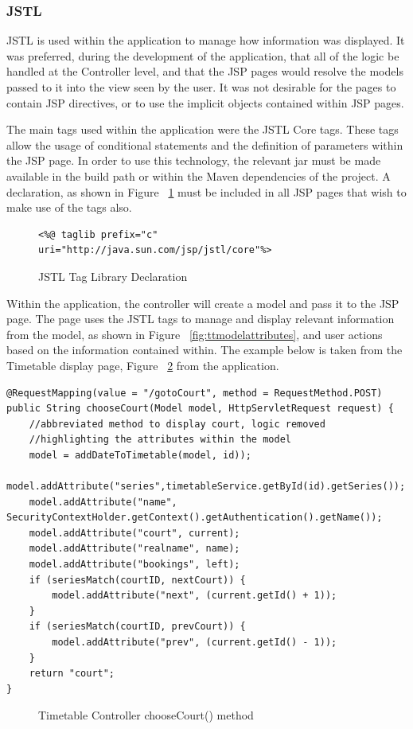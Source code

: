 \subsubsection{JSTL}

JSTL is used within the application to manage how information was displayed. It was preferred, during the development of the application, that all of the logic be handled at the Controller level, and that the JSP pages would resolve the models passed to it into the view seen by the user. It was not desirable for the pages to contain JSP directives, or to use the implicit objects contained within JSP pages. 

The main tags used within the application were the JSTL Core tags.  These tags allow the usage of conditional statements and the definition of parameters within the JSP page. In order to use this technology, the relevant jar must be made available in the build path or within the Maven dependencies of the project. A declaration, as shown in Figure ~\ref{fig:jstldec} must be included in all JSP pages that wish to make use of the tags also.\newline

\begin{figure}[H]
\begin{lstlisting}
<%@ taglib prefix="c" uri="http://java.sun.com/jsp/jstl/core"%>
\end{lstlisting}
\caption{JSTL Tag Library Declaration}
\label{fig:jstldec}
\end{figure}

Within the application, the controller will create a model and pass it to the JSP page. The page uses the JSTL tags to manage and display relevant information from the model, as shown in Figure ~\ref{fig:ttmodelattributes}, and user actions based on the information contained within. The example below is taken from the Timetable display page, Figure ~\ref{fig:ttcontrollerchoosecourt} from the application.\newline

\begin{lstlisting}
@RequestMapping(value = "/gotoCourt", method = RequestMethod.POST)
public String chooseCourt(Model model, HttpServletRequest request) {
	//abbreviated method to display court, logic removed
	//highlighting the attributes within the model
	model = addDateToTimetable(model, id));
	model.addAttribute("series",timetableService.getById(id).getSeries());
	model.addAttribute("name", SecurityContextHolder.getContext().getAuthentication().getName());
	model.addAttribute("court", current);
	model.addAttribute("realname", name);
	model.addAttribute("bookings", left);
	if (seriesMatch(courtID, nextCourt)) {
		model.addAttribute("next", (current.getId() + 1));
	}
	if (seriesMatch(courtID, prevCourt)) {
		model.addAttribute("prev", (current.getId() - 1));
	}
	return "court";
}
\end{lstlisting}	
\begin{figure}[H]
\caption{Timetable Controller chooseCourt() method}
\label{fig:ttcontrollerchoosecourt}
\end{figure}

